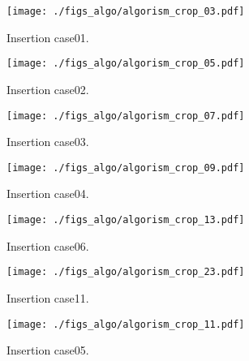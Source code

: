 \begin{figure}[h]
  \vspace{-0.5cm}
  \texttt{[image: ./figs\_algo/algorism\_crop\_03.pdf]}
  \caption{
    Insertion case01.
  }
  \label{fig_IpCHashT_insert_hard_case01}
  \vspace{-0.5cm}
\end{figure}

\begin{figure}[h]
  \vspace{-0.5cm}
  \texttt{[image: ./figs\_algo/algorism\_crop\_05.pdf]}
  \caption{
    Insertion case02.
  }
  \label{fig_IpCHashT_insert_hard_case02}
  \vspace{-0.5cm}
\end{figure}

\begin{figure}[h]
  \vspace{-0.5cm}
  \texttt{[image: ./figs\_algo/algorism\_crop\_07.pdf]}
  \caption{
    Insertion case03.
  }
  \label{fig_IpCHashT_insert_hard_case03}
  \vspace{-0.5cm}
\end{figure}

\begin{figure}[h]
  \vspace{-0.5cm}
  \texttt{[image: ./figs\_algo/algorism\_crop\_09.pdf]}
  \caption{
    Insertion case04.
  }
  \label{fig_IpCHashT_insert_hard_case04}
  \vspace{-0.5cm}
\end{figure}

\begin{figure}[h]
  \vspace{-0.5cm}
  \texttt{[image: ./figs\_algo/algorism\_crop\_13.pdf]}
  \caption{
    Insertion case06.%
  }
  \label{fig_IpCHashT_insert_hard_case06}
  \vspace{-0.5cm}
\end{figure}

\begin{figure}[h]
  \vspace{-0.5cm}
  \texttt{[image: ./figs\_algo/algorism\_crop\_23.pdf]}
  \caption{
    Insertion case11.%
  }
  \label{fig_IpCHashT_insert_hard_case11}
  \vspace{-0.5cm}
\end{figure}

\begin{figure}[h]
  \vspace{-0.5cm}
  \texttt{[image: ./figs\_algo/algorism\_crop\_11.pdf]}
  \caption{
    Insertion case05.%
  }
  \label{fig_IpCHashT_insert_hard_case05}
\end{figure}

